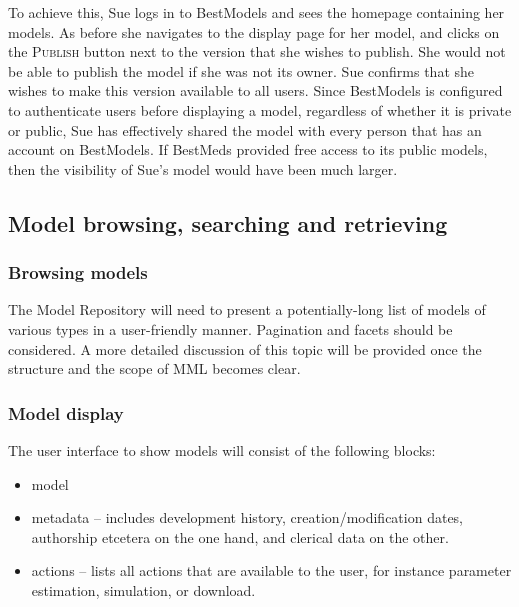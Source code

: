 To achieve this, Sue logs in to BestModels and sees the homepage containing her models. As before she navigates to the display page for her model, and clicks on the \textsc{Publish} button next to the version that she wishes to publish. She would not be able to publish the model if she was not its owner. Sue confirms that she wishes to make this version available to all users. Since BestModels is configured to authenticate users before displaying a model, regardless of whether it is private or public, Sue has effectively shared the model with every person that has an account on BestModels. If BestMeds provided free access to its public models, then the visibility of Sue's model would have been much larger.



\subsection{Model browsing, searching and retrieving}

\subsubsection{Browsing models}
The \ddmore Model Repository will need to present a potentially-long list of models of various types in a user-friendly manner. Pagination and facets should be considered. A more detailed discussion of this topic will be provided once the structure and the scope of MML becomes clear.

\subsubsection{Model display}
The user interface to show models will consist of the following blocks:
\begin{itemize}
\item model
\item metadata -- includes development history, creation/modification dates, authorship etcetera on the one hand, and clerical data on the other.
\item actions -- lists all actions that are available to the user, for instance parameter estimation, simulation, or download.
\end{itemize}

